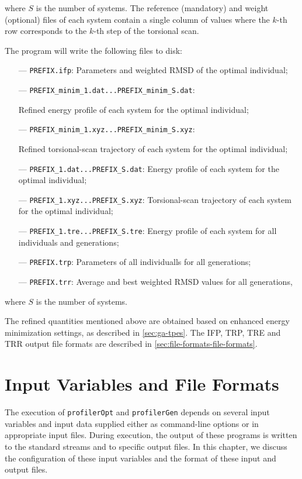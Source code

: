 \documentclass[10pt,a4paper,openany]{memoir}
\numberwithin{equation}{section}
\newcommand{\profileropt}[0]{\texttt{profilerOpt}}
\newcommand{\profilergen}[0]{\texttt{profilerGen}}
\begin{document}
\noindent where $S$ is the number of systems.
The reference (mandatory) and weight (optional) files of each system contain a single column
of values where the $k$-th row corresponds to the $k$-th step of the
torsional scan.

The program will write the following files to disk:
\begin{itemize}
\item [---]\texttt{PREFIX.ifp}: Parameters and weighted RMSD of the optimal individual;
\item[---] \texttt{PREFIX\_minim\_1.dat...PREFIX\_minim\_S.dat}: \par Refined energy profile of each system for the optimal individual;
\item[---] \texttt{PREFIX\_minim\_1.xyz...PREFIX\_minim\_S.xyz}: \par Refined torsional-scan trajectory of each system for the optimal individual;
\item[---] \texttt{PREFIX\_1.dat...PREFIX\_S.dat}: Energy profile of each system for the optimal individual;
\item[---] \texttt{PREFIX\_1.xyz...PREFIX\_S.xyz}: Torsional-scan trajectory of each system for the optimal individual;
\item [---]\texttt{PREFIX\_1.tre...PREFIX\_S.tre}: Energy profile of each system for all individuals and generations;
\item [---]\texttt{PREFIX.trp}: Parameters of all individualls for all generations;
\item [---]\texttt{PREFIX.trr}: Average and best weighted RMSD values for all generations,
\end{itemize}
where $S$ is the number of systems.

The refined quantities mentioned above are obtained based on enhanced
energy minimization settings, as described in \autoref{sec:ga-tpes}.
The IFP, TRP, TRE and TRR output file formats are described in
\autoref{sec:file-formats-file-formats}.

\chapter{Input Variables and File Formats}
\label{chap:file-formats}

The execution of \profileropt{} and \profilergen{} depends on several
input variables and input data supplied either as command-line options
or in appropriate input files.  During execution, the output of these
programs is written to the standard streams and to specific output
files. In this chapter, we discuss the configuration of these input
variables and the format of these input and output files.
\end{document}
